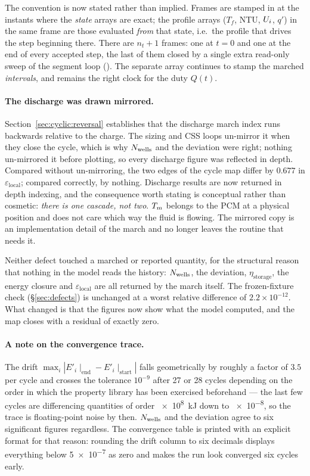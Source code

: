 The convention is now stated rather than implied. Frames are stamped in
 at the instants where the \emph{state} arrays are exact; the
profile arrays ($T_{f}$, NTU, $U_{i}$, $q'$) in the same frame are those evaluated
\emph{from} that state, i.e.\ the profile that drives the step beginning there.
There are $n_{t}+1$ frames: one at $t=0$ and one at the end of every accepted
step, the last of them closed by a single extra read-only sweep of the segment
loop (). The separate array  continues to stamp
the marched \emph{intervals}, and remains the right clock for the duty $Q(t)$.

\paragraph{The discharge was drawn mirrored.}
Section~\ref{sec:cyclic:reversal} establishes that the discharge march index
runs backwards relative to the charge. The sizing and CSS loops un-mirror it
when they close the cycle, which is why $N_{\mathrm{wells}}$ and the deviation were right;
nothing un-mirrored it before plotting, so every discharge figure was reflected
in depth. Compared without un-mirroring, the two edges of the cycle map differ
by $0.677$ in $\varepsilon_{\mathrm{local}}$; compared correctly, by nothing.
Discharge results are now returned in depth indexing, and the consequence worth
stating is conceptual rather than cosmetic: \emph{there is one cascade, not
two}. $T_{m}$ belongs to the PCM at a physical position and does not care which
way the fluid is flowing. The mirrored copy is an implementation detail of the
march and no longer leaves the routine that needs it.

\medskip
Neither defect touched a marched or reported quantity, for the structural
reason that nothing in the model reads the history: $N_{\mathrm{wells}}$, the deviation,
$\eta_{\mathrm{storage}}$, the energy closure and $\varepsilon_{\mathrm{local}}$
are all returned by the march itself. The frozen-fixture check
(\S\ref{sec:defects}) is unchanged at a worst relative difference of
$2.2\times10^{-12}$. What changed is that the figures now show what the model
computed, and the map closes with a residual of exactly zero.

\paragraph{A note on the convergence trace.}
The drift $\max_{i}|E'_{i}\!\mid_{\text{end}} - E'_{i}\!\mid_{\text{start}}|$
falls geometrically by roughly a factor of $3.5$ per cycle and crosses the
tolerance $10^{-9}$ after 27 or 28 cycles depending on the order in which the
property library has been exercised beforehand --- the last few cycles are
differencing quantities of order \SI{e8}{\kilo\joule} down to
\SI{e-8}{}, so the trace is floating-point noise by then. $N_{\mathrm{wells}}$ and the
deviation agree to six significant figures regardless. The convergence table is
printed with an explicit format for that reason: rounding the drift column to
six decimals displays everything below \num{5e-7} as zero and makes the run look
converged six cycles early.
